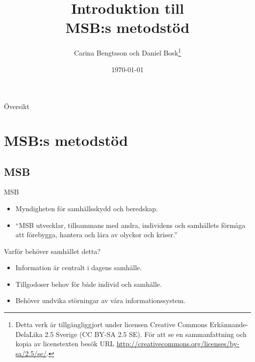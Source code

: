 \documentclass{beamer}
\title[Intro MSB]{%
  Introduktion till\\
  MSB:s metodstöd
}
\author{Carina Bengtsson och Daniel Bosk\footnote{%
  Detta verk är tillgängliggjort under licensen Creative Commons 
  Erkännande-DelaLika 2.5 Sverige (CC BY-SA 2.5 SE).
	För att se en sammanfattning och kopia av licenstexten besök URL 
	\url{http://creativecommons.org/licenses/by-sa/2.5/se/}.
}}
\institute[MIUN ITM]{%
  Avdelningen för informations- och kommunikationssytem (IKS),\\
  Mittuniversitetet, Sundsvall.
}
\date{\today}
\begin{document}
\begin{frame}
  \titlepage{}
\end{frame}

\begin{frame}{Översikt}
	\tableofcontents
\end{frame}





\section[Metodstöd]{MSB:s metodstöd}

\subsection{MSB}

\begin{frame}{MSB}
  \begin{itemize}
    \item Myndigheten för samhällsskydd och beredskap.
    \item \enquote{MSB utvecklar, tillsammans med andra, individens och 
        samhällets förmåga att förebygga, hantera och lära av olyckor och 
        kriser.}
  \end{itemize}
\end{frame}


\begin{frame}{Varför behöver samhället detta?}
  \begin{itemize}
    \item Information är centralt i dagens samhälle.
    \item Tillgodoser behov för både individ och samhälle.
    \item Behöver undvika störningar av våra informationssystem.
  \end{itemize}
\end{frame}
\end{document}
